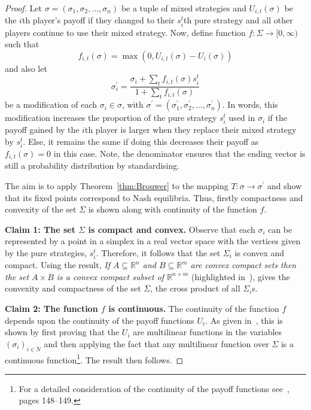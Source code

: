 \begin{proof}
    Let \(\sigma = (\sigma_{1}, \sigma_{2}, \ldots, \sigma_{n})\) be a tuple of
    mixed strategies and \(U_{i,t}(\sigma)\) be the \(i\)th player's payoff if
    they changed to their \(s_{i}^{t}\)th pure strategy and all other players
    continue to use their mixed strategy.
    Now, define function \(f: \Sigma \to [0, \infty)\) such that 
    \begin{equation}
        f_{i,t}(\sigma) = \max{(0, U_{i,t}(\sigma)-U_{i}(\sigma))}
    \end{equation}
    and also let 
    \begin{equation}
        \sigma_{i}^{\prime} = \frac{ \sigma_{i}+\sum_{t}{f_{i,t}(\sigma)s_{i}^{t}} }{ 1+\sum_{t}{f_{i,t}(\sigma)} }
    \end{equation}
    be a modification of each \(\sigma_{i} \in \sigma \), with \(\sigma^{\prime}
    = (\sigma_{1}^{\prime}, \sigma_{2}^{\prime}, \ldots, \sigma_{n}^{\prime})\).
    In words, this modification increases the proportion of the pure strategy
    \(s_{i}^{t}\) used in \(\sigma_{i}\) if the payoff gained by the \(i\)th player is
    larger when they replace their mixed strategy by \(s_{i}^{t}\). Else, it remains the
    same if doing this decreases their payoff as \(f_{i,t}(\sigma)=0\) in this
    case. Note, the denominator ensures that the ending vector is still a
    probability distribution by standardising.

    The aim is to apply Theorem~\ref{thm:Brouwer} to the mapping \(T: \sigma \to
    \sigma^{\prime}\) and show that its fixed points correspond to Nash
    equilibria. Thus, firstly compactness and convexity of the set \(\Sigma \)
    is shown along with continuity of the function \(f\). 
    
    \textbf{Claim 1: The set \(\Sigma \) is compact and convex.}
    Observe that each \(\sigma_{i}\) can be represented by a point in a simplex
    in a real vector space with the vertices given by the pure strategies,
    \(s_{i}^{t}\). Therefore, it follows that the set \(\Sigma_{i}\) is convex
    and compact. Using the result, \textit{If \(A \subseteq \mathbb{R}^{n}\) and
    \(B \subseteq \mathbb{R}^{m}\) are convex compact sets then the set \(A
    \times B\) is a convex compact subset of \(\mathbb{R}^{n+m}\)} (highlighted in~\cite{maschler_solan_zamir_2013}), gives the convexity and
    compactness of the set \(\Sigma \), the cross product of all
    \(\Sigma_{i}\)s. 
    
    \textbf{Claim 2: The function \(f\) is continuous.}
    The continuity of the function \(f\) depends upon the continuity of the
    payoff functions \(U_{i}\). As given in~\cite{maschler_solan_zamir_2013},
    this is shown by first proving that the \(U_{i}\) are multilinear functions
    in the variables \({(\sigma_{i})}_{i \in N}\) and then applying the fact
    that any multilinear function over \(\Sigma \) is a continuous
    function\footnote{For a detailed consideration of the continuity of the
    payoff functions see~\cite{maschler_solan_zamir_2013}, pages
    148--149.}. The result then follows.


\end{proof}
